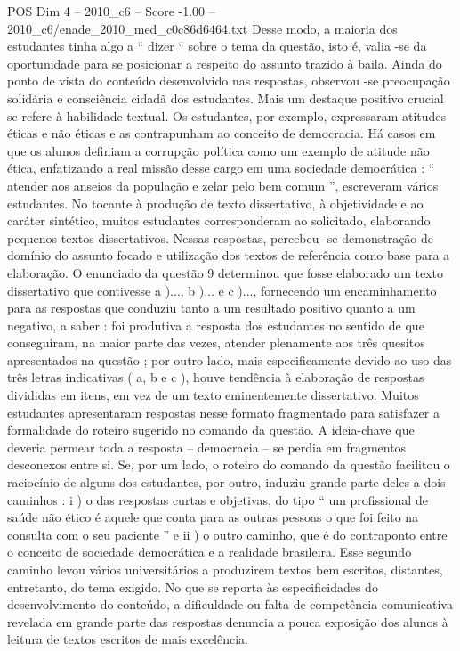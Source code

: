 \begin{textsample}{POS Dim 4 – 2010\_c6 – Score -1.00 – 2010\_c6/enade\_2010\_med\_c0c86d6464.txt}
Desse modo, a maioria dos estudantes tinha algo a “ dizer “ sobre o tema da questão, isto é, valia -se da oportunidade para se posicionar a respeito do assunto trazido à baila.
Ainda do ponto de vista do conteúdo desenvolvido nas respostas, observou -se preocupação solidária e consciência cidadã dos estudantes.
Mais um destaque positivo crucial se refere à habilidade textual.
Os estudantes, por exemplo, expressaram atitudes éticas e não éticas e as contrapunham ao conceito de democracia.
Há casos em que os alunos definiam a corrupção política como um exemplo de atitude não ética, enfatizando a real missão desse cargo em uma sociedade democrática : “ atender aos anseios da população e zelar pelo bem comum ”, escreveram vários estudantes.
No tocante à produção de texto dissertativo, à objetividade e ao caráter sintético, muitos estudantes corresponderam ao solicitado, elaborando pequenos textos dissertativos.
Nessas respostas, percebeu -se demonstração de domínio do assunto focado e utilização dos textos de referência como base para a elaboração.
O enunciado da questão 9 determinou que fosse elaborado um texto dissertativo que contivesse a )..., b )... e c )..., fornecendo um encaminhamento para as respostas que conduziu tanto a um resultado positivo quanto a um negativo, a saber : foi produtiva a resposta dos estudantes no sentido de que conseguiram, na maior parte das vezes, atender plenamente aos três quesitos apresentados na questão ; por outro lado, mais especificamente devido ao uso das três letras indicativas ( a, b e c ), houve tendência à elaboração de respostas divididas em itens, em vez de um texto eminentemente dissertativo.
Muitos estudantes apresentaram respostas nesse formato fragmentado para satisfazer a formalidade do roteiro sugerido no comando da questão.
A ideia-chave que deveria permear toda a resposta – democracia – se perdia em fragmentos desconexos entre si.
Se, por um lado, o roteiro do comando da questão facilitou o raciocínio de alguns dos estudantes, por outro, induziu grande parte deles a dois caminhos : i ) o das respostas curtas e objetivas, do tipo “ um profissional de saúde não ético é aquele que conta para as outras pessoas o que foi feito na consulta com o seu paciente ” e ii ) o outro caminho, que é do contraponto entre o conceito de sociedade democrática e a realidade brasileira.
Esse segundo caminho levou vários universitários a produzirem textos bem escritos, distantes, entretanto, do tema exigido.
No que se reporta às especificidades do desenvolvimento do conteúdo, a dificuldade ou falta de competência comunicativa revelada em grande parte das respostas denuncia a pouca exposição dos alunos à leitura de textos escritos de mais excelência.

\end{textsample}
